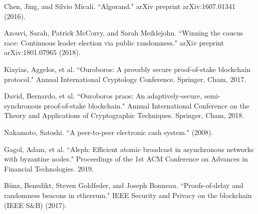 \documentclass[11pt]{article}
\theoremstyle{definition}
\theoremstyle{remark}
\begin{document}
\begin{thebibliography}{100}
Chen, Jing, and Silvio Micali. ``Algorand." arXiv preprint arXiv:1607.01341 (2016).

Azouvi, Sarah, Patrick McCorry, and Sarah Meiklejohn. ``Winning the caucus race: Continuous leader election via public randomness." arXiv preprint arXiv:1801.07965 (2018).

Kiayias, Aggelos, et al. ``Ouroboros: A provably secure proof-of-stake blockchain protocol." Annual International Cryptology Conference. Springer, Cham, 2017.

David, Bernardo, et al. ``Ouroboros praos: An adaptively-secure, semi-synchronous proof-of-stake blockchain." Annual International Conference on the Theory and Applications of Cryptographic Techniques. Springer, Cham, 2018.

Nakamoto, Satoshi. ``A peer-to-peer electronic cash system."  (2008).

Gagol, Adam, et al. ``Aleph: Efficient atomic broadcast in asynchronous networks with byzantine nodes." Proceedings of the 1st ACM Conference on Advances in Financial Technologies. 2019.

Bünz, Benedikt, Steven Goldfeder, and Joseph Bonneau. ``Proofs-of-delay and randomness beacons in ethereum." IEEE Security and Privacy on the blockchain (IEEE S\&B) (2017).
\end{thebibliography}
\end{document}
